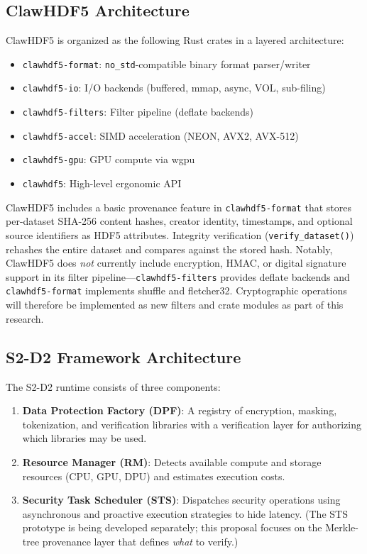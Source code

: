 \documentclass[11pt]{article}
\begin{document}
\subsection{ClawHDF5 Architecture}

ClawHDF5 is organized as the following Rust crates in a layered architecture:

\begin{itemize}[nosep]
  \item \texttt{clawhdf5-format}: \texttt{no\_std}-compatible binary format parser/writer
  \item \texttt{clawhdf5-io}: I/O backends (buffered, mmap, async, VOL, sub-filing)
  \item \texttt{clawhdf5-filters}: Filter pipeline (deflate backends)
  \item \texttt{clawhdf5-accel}: SIMD acceleration (NEON, AVX2, AVX-512)
  \item \texttt{clawhdf5-gpu}: GPU compute via wgpu~\cite{wgpu}
  \item \texttt{clawhdf5}: High-level ergonomic API
\end{itemize}

\noindent ClawHDF5 includes a basic provenance feature in
\texttt{clawhdf5-format} that stores per-dataset SHA-256 content hashes,
creator identity, timestamps, and optional source identifiers as HDF5
attributes. Integrity verification (\texttt{verify\_dataset()}) rehashes the
entire dataset and compares against the stored hash. Notably, ClawHDF5 does
\emph{not} currently include encryption, HMAC, or digital signature support in
its filter pipeline---\texttt{clawhdf5-filters} provides deflate backends
and \texttt{clawhdf5-format} implements shuffle and fletcher32. Cryptographic operations will therefore be
implemented as new filters and crate modules as part of this research.

\subsection{S2-D2 Framework Architecture}

The S2-D2 runtime consists of three components:

\begin{enumerate}[nosep]
  \item \textbf{Data Protection Factory (DPF)}: A registry of encryption, masking,
    tokenization, and verification libraries with a verification layer for
    authorizing which libraries may be used.
  \item \textbf{Resource Manager (RM)}: Detects available compute and storage
    resources (CPU, GPU, DPU) and estimates execution costs.
  \item \textbf{Security Task Scheduler (STS)}: Dispatches security operations
    using asynchronous and proactive execution strategies to hide latency.
    (The STS prototype is being developed separately; this proposal focuses on
    the Merkle-tree provenance layer that defines \emph{what} to verify.)
\end{enumerate}
\end{document}

